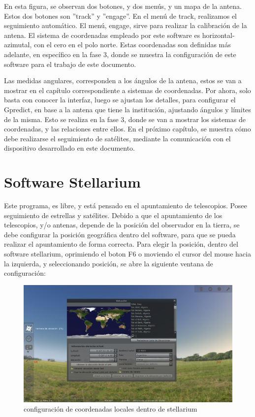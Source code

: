 En esta figura, se observan dos botones, y dos menús, y un mapa de la antena. Estos dos botones son ''track'' y ''engage''. En el menú de track, realizamos el seguimiento automático. El menú, engage, sirve para realizar la calibración de la antena. El sistema de coordenadas empleado por este software es horizontal-azimutal, con el cero en el polo norte. Estas coordenadas son definidas más adelante, en específico en la fase 3, donde se muestra la configuración de este software para el trabajo de este documento.  

Las medidas angulares, corresponden a los ángulos de la antena, estos se van a mostrar en el capítulo correspondiente a sistemas de coordenadas. Por ahora, solo basta con conocer la interfaz, luego se ajustan los detalles, para configurar el Gpredict, en base a la antena que tiene la institución, ajustando ángulos y límites de la misma. Esto se realiza en la fase 3, donde se van a mostrar los sistemas de coordenadas, y las relaciones entre ellos. En el próximo capítulo, se muestra cómo debe realizarse el seguimiento de satélites, mediante la comunicación con el dispositivo desarrollado en este documento. 



 
\section{Software Stellarium} 


Este programa, es libre, y está pensado en el apuntamiento de telescopios. Posee seguimiento de estrellas y satélites. Debido a que el apuntamiento de los telescopios, y/o antenas, depende de la posición del observador en la tierra, se debe configurar la posición geográfica dentro del software, para que se pueda realizar el apuntamiento de forma correcta. Para elegir la posición, dentro del software stellarium, oprimiendo el boton F6 o moviendo el cursor del mouse hacia la izquierda, y seleccionando posición, se abre la siguiente ventana de configuración: 
\begin{figure}[ht]
	\includegraphics[width=\textwidth]{stel_sel_pos} 
	\caption{configuración de coordenadas locales dentro de stellarium} 
	\label{fig:stell_poss_conf}
\end{figure}

